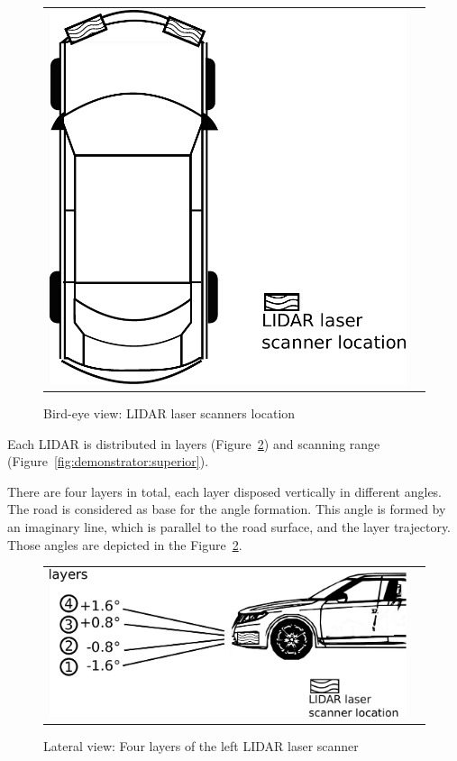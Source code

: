 \begin{figure}[h]
   \centering
     \begin{tabular}{lr}
       \includegraphics[scale=0.4]{img/fig:demonstrator:birdeye}
     \end{tabular}
   \caption{Bird-eye view: LIDAR laser scanners location}
   \label{fig:demonstrator:birdeye}
\end{figure}

Each LIDAR is distributed in layers (Figure~\ref{fig:demonstrator:lateral}) and scanning range (Figure~\ref{fig:demonstrator:superior}). 

There are four layers in total, each layer disposed vertically in different angles. The road is considered as base for the angle formation. This angle is formed by an imaginary line, which is parallel to the road surface, and the layer trajectory. Those angles are depicted in the Figure~\ref{fig:demonstrator:lateral}.

\begin{figure}[h]
   \centering
     \begin{tabular}{lr}
       \includegraphics[scale=0.5]{img/fig:demonstrator:lateral}
     \end{tabular}
   \caption{Lateral view: Four layers of the left LIDAR laser scanner}
   \label{fig:demonstrator:lateral}
\end{figure}

